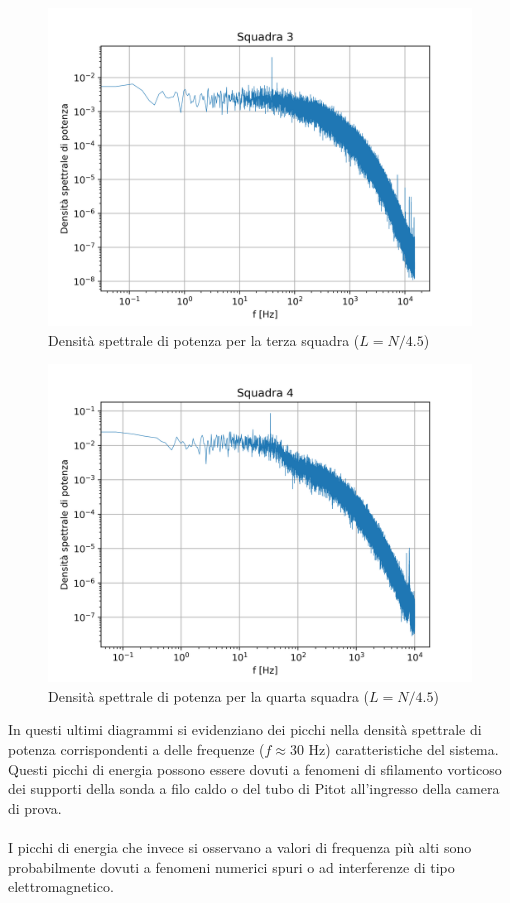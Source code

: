 \begin{figure}[H]
    \centering
    \includegraphics[width=.8\textwidth]{images/9/sq3timeserieswelch.png}
    \caption{Densità spettrale di potenza per la terza squadra ($L=N/4.5$)}
\end{figure}

\begin{figure}[H]
    \centering
    \includegraphics[width=\textwidth]{images/9/sq4timeserieswelch.png}
    \caption{Densità spettrale di potenza per la quarta squadra ($L=N/4.5$)}
\end{figure}

\noindent In questi ultimi diagrammi si evidenziano dei picchi nella densità spettrale di potenza corrispondenti a delle frequenze ($f\approx30$ Hz) caratteristiche del sistema. Questi picchi di energia possono essere dovuti a fenomeni di sfilamento vorticoso dei supporti della sonda a filo caldo o del tubo di Pitot all'ingresso della camera di prova.\\\\
I picchi di energia che invece si osservano a valori di frequenza più alti sono probabilmente dovuti a fenomeni numerici spuri o ad interferenze di tipo elettromagnetico.